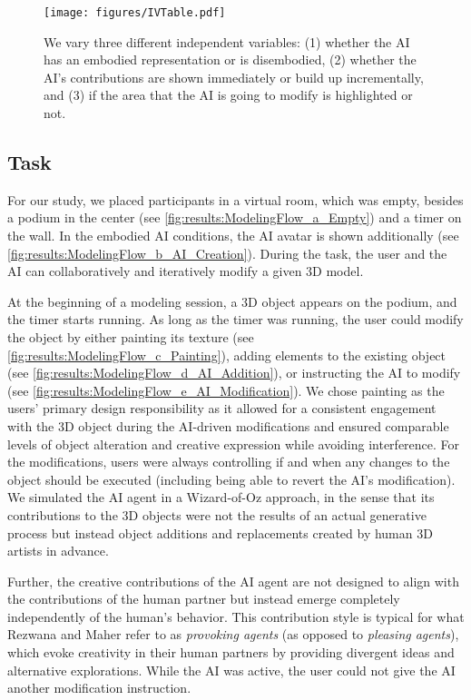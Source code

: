\begin{figure*}%
	\texttt{[image: figures/IVTable.pdf]}\vspace{.3cm} 
	\caption{We vary three different independent variables: (1) whether the AI has an embodied representation or is disembodied, (2) whether the AI's contributions are shown immediately or build up incrementally, and (3) if the area that the AI is going to modify is highlighted or not.}
	\label{fig:IVs}
\end{figure*}



\subsection{Task}
For our study, we placed participants in a virtual room, which was empty, besides a podium in the center (see \autoref{fig:results:ModelingFlow_a_Empty}) and a timer on the wall. In the embodied AI conditions, the AI avatar is shown additionally (see \autoref{fig:results:ModelingFlow_b_AI_Creation}). During the task, the user and the AI can collaboratively and iteratively modify a given 3D model. 

At the beginning of a modeling session, a 3D object appears on the podium, and the timer starts running. As long as the timer was running, the user could modify the object by either painting its texture (see \autoref{fig:results:ModelingFlow_c_Painting}), adding elements to the existing object (see \autoref{fig:results:ModelingFlow_d_AI_Addition}), or instructing the AI to modify (see \autoref{fig:results:ModelingFlow_e_AI_Modification}).
We chose painting as the users' primary design responsibility as it allowed for a consistent engagement with the 3D object during the AI-driven modifications and ensured comparable levels of object alteration and creative expression while avoiding interference.
For the modifications, users were always controlling if and when any changes to the object should be executed (including being able to revert the AI's modification).
We simulated the AI agent in a Wizard-of-Oz approach, in the sense that its contributions to the 3D objects were not the results of an actual generative process but instead object additions and replacements created by human 3D artists in advance. 

Further, the creative contributions of the AI agent are not designed to align with the contributions of the human partner but instead emerge completely independently of the human's behavior. This contribution style is typical for what Rezwana and Maher \cite{rezwana_designing_2022} refer to as \textit{provoking agents} (as opposed to \textit{pleasing agents}), which evoke creativity in their human partners by providing divergent ideas and alternative explorations.
While the AI was active, the user could not give the AI another modification instruction. %

